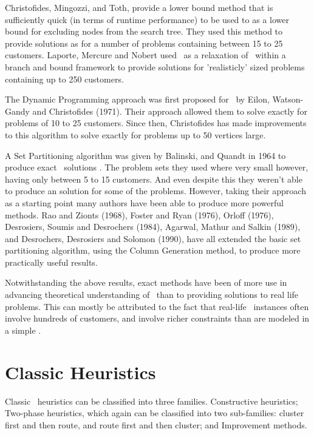Christofides, Mingozzi, and Toth, \cite{CMT:1981} provide a lower bound method that is sufficiently quick (in terms of runtime performance) to be used to as a lower bound for excluding nodes from the search tree. They used this method to provide solutions as for a number of problems containing between 15 to 25 customers. Laporte, Mercure and Nobert \cite{LMN:1986} used \MTSP\ as a relaxation of \VRP\ within a branch and bound framework to provide solutions for 'realisticly' sized problems containing up to 250 customers.  

The Dynamic Programming approach was first proposed for \VRP\ by Eilon, Watson-Gandy and Christofides (1971). Their approach allowed them to solve exactly for problems of 10 to 25 customers. Since then, Christofides has made improvements to this algorithm to solve exactly for problems up to 50 vertices large.

A Set Partitioning algorithm was given by Balinski, and Quandt in 1964 to produce exact \VRP\ solutions \cite{balinski:64}. The problem sets they used where very small however, having only between 5 to 15 customers. And even despite this they weren't able to produce an solution for some of the problems. However, taking their approach as a starting point many authors have been able to produce more powerful methods. Rao and Zionts (1968), Foster and Ryan (1976), Orloff (1976), Desrosiers, Soumis and Desrochers (1984), Agarwal, Mathur and Salkin (1989), and Desrochers, Desrosiers and Solomon (1990), have all extended the basic set partitioning algorithm, using the Column Generation method, to produce more practically useful results. 

Notwithstanding the above results, exact methods have been of more use in advancing theoretical understanding of \VRP\ than to providing solutions to real life problems. This can mostly be attributed to the fact that real-life \VRP\ instances often involve hundreds of customers, and involve richer constraints than are modeled in a simple \VRP.

\section{Classic Heuristics}

Classic \VRP\ heuristics can be classified into three families. Constructive heuristics; Two-phase heuristics, which again can be classified into two sub-families: cluster first and then route, and route first and then cluster; and Improvement methods.

